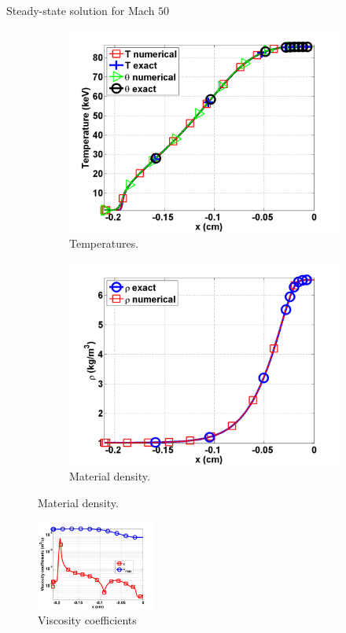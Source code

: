 \documentclass[xcolor=dvipsnames,10pt]{beamer}
\begin{document}
\begin{frame}{Steady-state solution for Mach $50$}
\begin{figure}
\begin{subfigure}[b]{0.35\textwidth}
                \centering
                \includegraphics[width=\textwidth]{../figures/Mach_50_nel_1000_temperature.png}
        \caption{Temperatures.}
\end{subfigure}
\begin{subfigure}[b]{0.35\textwidth}
                \centering
                \includegraphics[width=\textwidth]{../figures/Mach_50_nel_1000_density.png}
        \caption{Material density.}
\end{subfigure}
\end{figure}

\begin{figure}
                \centering
                \includegraphics[width=0.35\textwidth]{../figures/Mach_50_nel_1000_viscosity.png}
        \caption{Viscosity coefficients}
\end{figure}
\end{frame}
\end{document}
